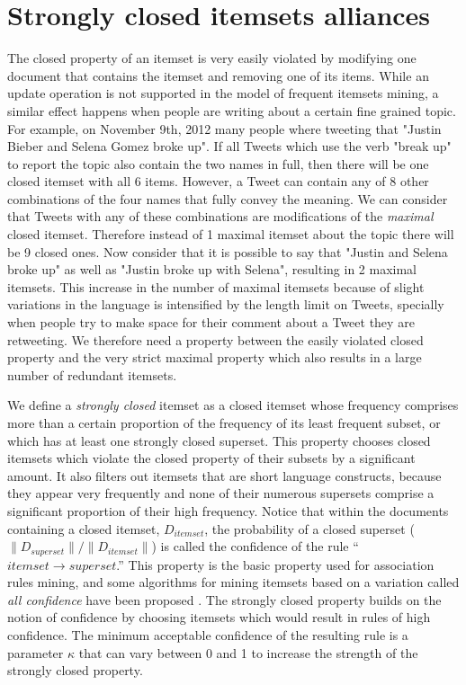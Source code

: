 \documentclass{sig-alternate}
\begin{document}
\section{Strongly closed itemsets alliances}
\label{sec:strong}
The closed property of an itemset is very easily violated by modifying one document that contains the itemset and removing one of its items. While an update operation is not supported in the model of frequent itemsets mining, a similar effect happens when people are writing about a certain fine grained topic. For example, on November 9th, 2012 many people where tweeting that "Justin Bieber and Selena Gomez broke up". If all Tweets which use the verb "break up" to report the topic also contain the two names in full, then there will be one closed itemset with all 6 items. However, a Tweet can contain any of 8 other combinations of the four names that fully convey the meaning. We can consider that Tweets with any of these combinations are modifications of the \emph{maximal} closed itemset. Therefore instead of 1 maximal itemset about the topic there will be 9 closed ones. Now consider that it is possible to say that "Justin and Selena broke up" as well as "Justin broke up with Selena", resulting in 2 maximal itemsets. This increase in the number of maximal itemsets because of slight variations in the language is intensified by the length limit on Tweets, specially when people try to make space for their comment about a Tweet they are retweeting. We therefore need a property between the easily violated closed property and the very strict maximal property which also results in a large number of redundant itemsets. 

We define a \emph{strongly closed} itemset as a closed itemset whose frequency comprises more than a certain proportion of the frequency of its least frequent subset, or which has at least one strongly closed superset. This property chooses closed itemsets which violate the closed property of their subsets by a significant amount. It also filters out itemsets that are short language constructs, because they appear very frequently and none of their numerous supersets comprise a significant proportion of their high frequency. Notice that within the documents containing a closed itemset, $D_{itemset}$, the probability of a closed superset ($\|D_{superset}\| / \|D_{itemset}\|$) is called the confidence of the rule ``$itemset \rightarrow superset$.'' This property is the basic property used for association rules mining, and some algorithms for mining itemsets based on a variation called \emph{all confidence} have been proposed \cite{confidenceclosed}. The strongly closed property builds on the notion of confidence by choosing itemsets which would result in rules of high confidence. The minimum acceptable confidence of the resulting rule is a parameter $\kappa$ that can vary between 0 and 1 to increase the strength of the strongly closed property.
\end{document}
